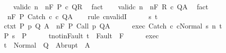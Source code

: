 \begin{isabellebody}
\ \ \isamarkupfalse%
\ valid{\isacharunderscore}c{}{\isacharcolon}\ {\isachardoublequoteopen}{\isasymAnd}n{\isachardot}\ {\isasymGamma}{\isacharcomma}{\isasymTheta}\ {\isasymTurnstile}n{\isacharcolon}\isactrlbsub {\isacharslash}F\isactrlesub \ P\ c\ Q{\isacharcomma}R{\isachardoublequoteclose}\ \isamarkupfalse%
\ fact\isanewline
\ \ \isamarkupfalse%
\ valid{\isacharunderscore}c{}{\isacharcolon}\ {\isachardoublequoteopen}{\isasymAnd}n{\isachardot}\ {\isasymGamma}{\isacharcomma}{\isasymTheta}\ {\isasymTurnstile}n{\isacharcolon}\isactrlbsub {\isacharslash}F\isactrlesub \ R\ c\ Q{\isacharcomma}A{\isachardoublequoteclose}\ \isamarkupfalse%
\ fact\isanewline
\ \ \isamarkupfalse%
\ {\isachardoublequoteopen}{\isasymGamma}{\isacharcomma}{\isasymTheta}\ {\isasymTurnstile}n{\isacharcolon}\isactrlbsub {\isacharslash}F\isactrlesub \ P\ Catch\ c\ c\ Q{\isacharcomma}A{\isachardoublequoteclose}\isanewline
\ \ \isamarkupfalse%
\ {\isacharparenleft}rule\ cnvalidI{\isacharparenright}\isanewline
\ \ \ \ \isamarkupfalse%
\ s\ t\isanewline
\ \ \ \ \isamarkupfalse%
\ ctxt{\isacharcolon}\ {\isachardoublequoteopen}{\isasymforall}{\isacharparenleft}P{\isacharcomma}\ p{\isacharcomma}\ Q{\isacharcomma}\ A{\isacharparenright}{\isasymin}{\isasymTheta}{\isachardot}\ {\isasymGamma}\ {\isasymTurnstile}n{\isacharcolon}\isactrlbsub {\isacharslash}F\isactrlesub \ P\ {\isacharparenleft}Call\ p{\isacharparenright}\ Q{\isacharcomma}A{\isachardoublequoteclose}\isanewline
\ \ \ \ \isamarkupfalse%
\ exec{\isacharcolon}\ {\isachardoublequoteopen}{\isasymGamma}{\isasymturnstile}{\isasymlangle}Catch\ c\ cNormal\ s{\isasymrangle}\ {\isacharequal}n{\isasymRightarrow}\ t{\isachardoublequoteclose}\ \isanewline
\ \ \ \ \isamarkupfalse%
\ P{\isacharcolon}\ {\isachardoublequoteopen}s\ {\isasymin}\ P{\isachardoublequoteclose}\isanewline
\ \ \ \ \isamarkupfalse%
\ t{\isacharunderscore}notin{\isacharunderscore}Fault{\isacharcolon}\ {\isachardoublequoteopen}t\ {\isasymnotin}\ Fault\ {\isacharbackquote}\ F{\isachardoublequoteclose}\isanewline
\ \ \ \ \isamarkupfalse%
\ exec\ \isamarkupfalse%
\ {\isachardoublequoteopen}t\ {\isasymin}\ Normal\ {\isacharbackquote}\ Q\ {\isasymunion}\ Abrupt\ {\isacharbackquote}\ A{\isachardoublequoteclose}\isanewline

\end{isabellebody}
